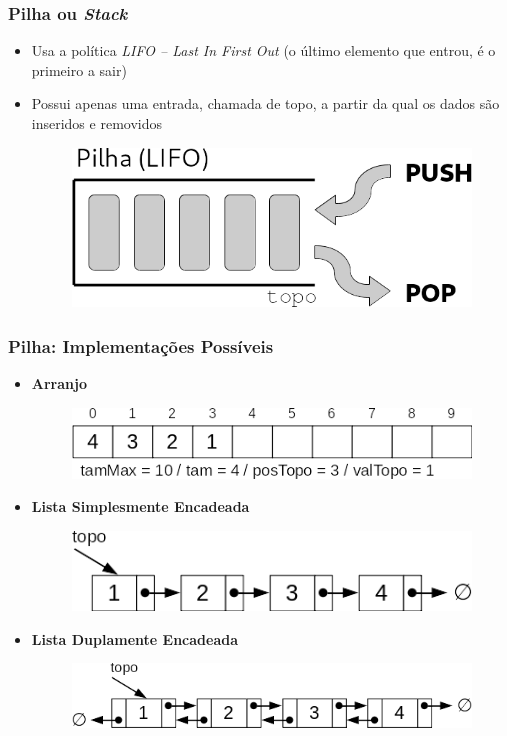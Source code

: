\documentclass[aspectratio=169]{beamer}
\begin{document}
\begin{frame}\frametitle{Pilha ou \emph{Stack}}
\begin{itemize}
	\item Usa a política \emph{LIFO -- Last In First Out} (o último elemento que entrou, é o primeiro a sair)
	\item Possui apenas uma entrada, chamada de topo, a partir da qual os dados são inseridos e removidos
\begin{figure}[h]
	\centering
	\includegraphics[height=0.3\paperheight]{imagens/pilha.png}
\end{figure}
\end{itemize}
\end{frame}

\begin{frame}\frametitle{Pilha: Implementações Possíveis}
\begin{itemize}
	\item \textbf{Arranjo}
\begin{figure}[h]
	\flushleft
	\includegraphics[height=0.15\paperheight]{imagens/pilha1.png}
\end{figure}
	\item \textbf{Lista Simplesmente Encadeada}
\begin{figure}[h]
	\flushleft
	\includegraphics[height=0.15\paperheight]{imagens/pilha2.png}
\end{figure}
	\item \textbf{Lista Duplamente Encadeada}
\begin{figure}[h]
	\flushleft
	\includegraphics[height=0.15\paperheight]{imagens/pilha3.png}
\end{figure}
\end{itemize}
\end{frame}
\end{document}
